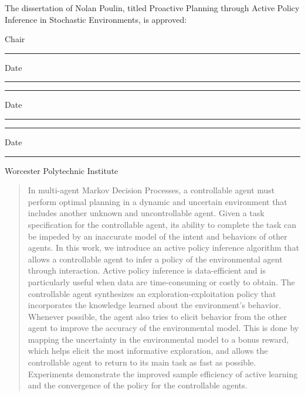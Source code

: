 \documentclass[12pt]{report}
\begin{document}
\thispagestyle{empty}

\noindent
The dissertation of Nolan Poulin, titled Proactive Planning through Active Policy Inference in Stochastic Environments,
is approved:
\vfill

\vspace{0.5in}
Chair \rule{3in}{0.8pt} Date \rule{1in}{0.8pt}


\vspace{0.5in}
\hspace{0.4in} \rule{3in}{0.7pt} Date \rule{1in}{0.7pt}


\vspace{0.5in}
\hspace{0.4in} \rule{3in}{0.8pt} Date \rule{1in}{0.8pt}
\vfill
\begin{center}
	Worcester Polytechnic Institute
\end{center}

\newpage

%
\doublespacing

%
\begin{abstract}
    In multi-agent Markov Decision Processes, a controllable agent must perform optimal planning in a dynamic and
    uncertain environment that includes another unknown and uncontrollable agent.  Given a task specification for the
    controllable agent, its ability to complete the task can be impeded by an inaccurate model of the intent and
    behaviors of other agents. In this work, we introduce an active policy inference algorithm that allows a
    controllable agent to infer a policy of the environmental agent through interaction. Active policy inference is
    data-efficient and is particularly useful when data are time-consuming or costly to obtain. The controllable agent
    synthesizes an exploration-exploitation policy that incorporates the knowledge learned about the environment's
    behavior. Whenever possible, the agent also tries to elicit behavior from the other agent to improve the accuracy of
    the environmental model.  This is done by mapping the uncertainty in the environmental model to a bonus reward,
    which helps elicit the most informative exploration, and allows the controllable agent to return to its main task as
    fast as possible.  Experiments demonstrate the improved sample efficiency of active learning and the convergence of
    the policy for the controllable agents.
\end{abstract}
\end{document}
